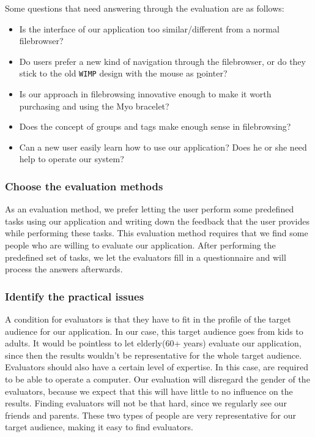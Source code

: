\documentclass{article}
\begin{document}
Some questions that need answering through the evaluation are as follows:
\begin{itemize}
\item Is the interface of our application too similar/different from a normal filebrowser?
\item Do users prefer a new kind of navigation through the filebrowser, or do they stick to the old \texttt{WIMP} design with the mouse as \underline{p}ointer?
\item Is our approach in filebrowsing innovative enough to make it worth purchasing and using the Myo bracelet?
\item Does the concept of groups and tags make enough sense in filebrowsing?
\item Can a new user easily learn how to use our application? Does he or she need help to operate our system?
\end{itemize}

\subsubsection{\textbf{C}hoose the evaluation methods}

As an evaluation method, we prefer letting the user perform some predefined tasks using our application and writing down the feedback that the user provides while performing these tasks. This evaluation method requires that we find some people who are willing to evaluate our application. After performing the predefined set of tasks, we let the evaluators fill in a questionnaire and will process the answers afterwards.

\subsubsection{\textbf{I}dentify the practical issues}

A condition for evaluators is that they have to fit in the profile of the target audience for our application. In our case, this target audience goes from kids to adults. It would be pointless to let elderly(60+ years) evaluate our application, since then the results wouldn't be representative for the whole target audience. Evaluators should also have a certain level of expertise. In this case, are required to be able to operate a computer. Our evaluation will disregard the gender of the evaluators, because we expect that this will have little to no influence on the results. Finding evaluators will not be that hard, since we regularly see our friends and parents. These two types of people are very representative for our target audience, making it easy to find evaluators.
\end{document}
